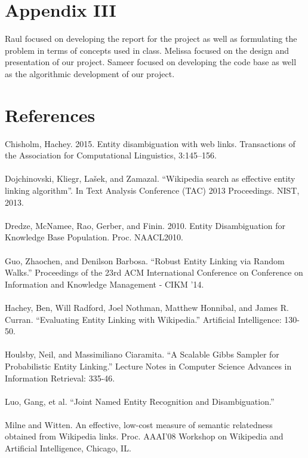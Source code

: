 \documentclass[twoside,11pt]{article}
\begin{document}
\section{Appendix III}
Raul focused on developing the report for the project as well as formulating the problem in terms of concepts used in class. Melissa focused on the design and presentation of our project. Sameer focused on developing the code base as well as the algorithmic development of our project.
\section{References}

Chisholm, Hachey. 2015. Entity disambiguation with web links. Transactions of the Association for Computational Linguistics, 3:145–156.
\\ \\
Dojchinovski, Kliegr, Lašek, and Zamazal. ``Wikipedia search as effective entity linking algorithm''. In Text Analysis Conference (TAC) 2013 Proceedings. NIST, 2013.
\\ \\
Dredze, McNamee, Rao, Gerber, and Finin. 2010. Entity Disambiguation for Knowledge Base Population. Proc. NAACL2010.
\\ \\
Guo, Zhaochen, and Denilson Barbosa. ``Robust Entity Linking via Random Walks.'' Proceedings of the 23rd ACM International Conference on Conference on Information and Knowledge Management - CIKM '14.
\\ \\
Hachey, Ben, Will Radford, Joel Nothman, Matthew Honnibal, and James R. Curran. ``Evaluating Entity Linking with Wikipedia.'' Artificial Intelligence: 130-50.
\\ \\
Houlsby, Neil, and Massimiliano Ciaramita. ``A Scalable Gibbs Sampler for Probabilistic Entity Linking.'' Lecture Notes in Computer Science Advances in Information Retrieval: 335-46.
\\ \\
Luo, Gang, et al. ``Joint Named Entity Recognition and Disambiguation.''
\\ \\
Milne and Witten. An effective, low-cost measure of semantic relatedness obtained from Wikipedia links. Proc. AAAI’08 Workshop on Wikipedia and Artificial Intelligence, Chicago, IL.
\end{document}
